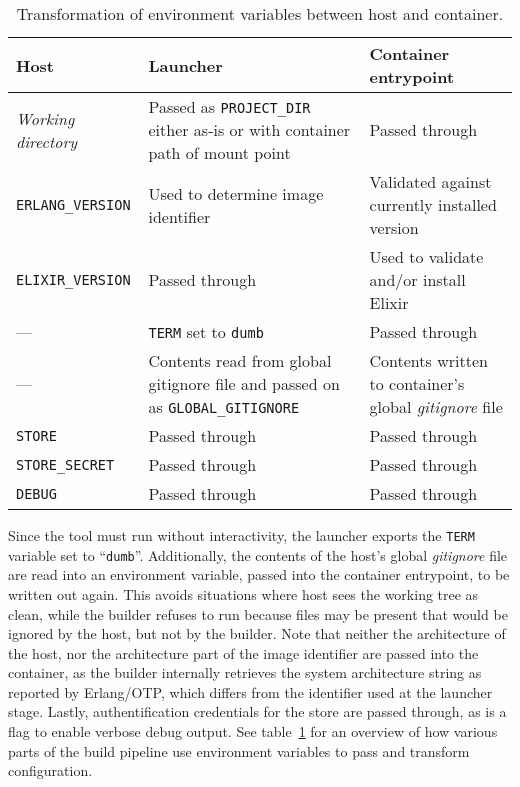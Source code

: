 \begin{table}[h]
  \setlength{\tabcolsep}{10pt}
  \centering
  \begin{tabularx}{\textwidth}{l X X}
    Host & Launcher & Container entrypoint \\
    \hline
    \emph{Working directory} &
      Passed as \lstinline|PROJECT_DIR| \newline
      either as-is or with container path of mount point &
      Passed through \\
    \hline
    \lstinline|ERLANG_VERSION| &
      Used to determine \newline
      image identifier &
      Validated against \newline
      currently installed version \\
    \hline
    \lstinline|ELIXIR_VERSION| &
      Passed through &
      Used to validate and/or \newline
      install Elixir \\
    \hline
    --- &
      \lstinline|TERM| set to \lstinline|dumb| &
      Passed through \\
    \hline
    --- &
      Contents read from global gitignore
      file and passed on as \lstinline|GLOBAL_GITIGNORE| &
      Contents written to \newline
      container's global \newline
      \emph{gitignore} file \\
    \hline
    \lstinline|STORE| & Passed through & Passed through \\
    \hline
    \lstinline|STORE_SECRET| & Passed through & Passed through \\
    \hline
    \lstinline|DEBUG| & Passed through & Passed through \\
  \end{tabularx}
  \caption{Transformation of environment variables between host and container.}\label{table:envvars}
\end{table}

Since the tool must run without interactivity, the launcher exports the \lstinline|TERM| variable set to ``\lstinline|dumb|''. Additionally, the contents of the host's global \emph{gitignore} file are read into an environment variable, passed into the container entrypoint, to be written out again. This avoids situations where host sees the working tree as clean, while the builder refuses to run because files may be present that would be ignored by the host, but not by the builder. Note that neither the architecture of the host, nor the architecture part of the image identifier are passed into the container, as the builder internally retrieves the system architecture string as reported by Erlang/OTP, which differs from the identifier used at the launcher stage. Lastly, authentification credentials for the store are passed through, as is a flag to enable verbose debug output. See table~\ref{table:envvars} for an overview of how various parts of the build pipeline use environment variables to pass and transform configuration.

